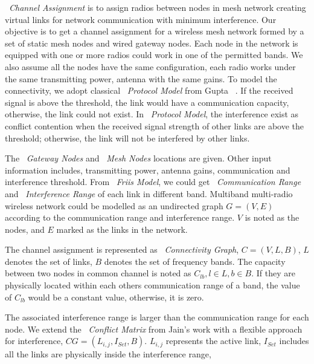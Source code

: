 ~\emph{Channel Assignment} is to assign radios between nodes in mesh network creating virtual links for network communication with minimum interference.
Our objective is to get a channel assignment for a wireless mesh network formed by a set of static mesh nodes and wired gateway nodes. 
Each node in the network is equipped with one or more radios could work in one of the permitted bands. 
We also assume all the nodes have the same configuration, each radio works under the same transmitting power, antenna with the same gains.
To model the connectivity, we adopt classical ~\emph{Protocol Model} from Gupta ~\cite{gupta2000capacity}. If the received signal is above the threshold, the link would have a communication capacity, otherwise, the link could not exist.
In ~\emph{Protocol Model}, the interference exist as conflict contention when the received signal strength of other links are above the threshold; otherwise, the link will not be interfered by other links.

The ~\emph{Gateway Nodes} and ~\emph{Mesh Nodes} locations are given. 
Other input information includes, transmitting power, antenna gains, communication and interference threshold. From ~\emph{Friis Model}, we could get ~\emph{Communication Range} and ~\emph{Interference Range} of each link in different band. 
Multiband multi-radio wireless network could be modelled as an undirected graph $G=(V,E)$ according to the communication range and interference range. $V$ is noted as the nodes, and $E$ marked as the links in the network.

The channel assignment is represented as ~\emph{Connectivity Graph}, $C=(V,L,B)$, $L$ denotes the set of links, $B$ denotes the set of frequency bands. 
The capacity between two nodes in common channel is noted as $C_{lb}, l \in L,b \in B$. If they are physically located within each others communication range of a band, the value of $C_{lb}$ would be a constant value, otherwise, it is zero. 

The associated interference range is larger than the communication range for each node. We extend the ~\emph{Conflict Matrix} from Jain's work with a flexible approach for interference, $CG=(L_{i,j},I_{Set},B)$. $L_{i,j}$ represents the active link, $I_{Set}$ includes all the links are physically inside the interference range, 

